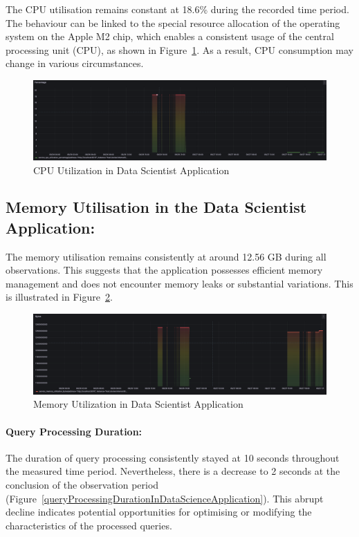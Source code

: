 \documentclass[journal]{IEEEtran}
\begin{document}
The CPU utilisation remains constant at 18.6\% during the recorded time period. The behaviour can be linked to the special resource allocation of the operating system on the Apple M2 chip, which enables a consistent usage of the central processing unit (CPU), as shown in Figure~\ref{cpuUtilizationInDataScientistApplication}. As a result, CPU consumption may change in various circumstances.

\begin{figure}[h]
  \centering
  \includegraphics[width=\textwidth]{images/CPU-utilization-data-scientist-application.png}
  \caption{CPU Utilization in Data Scientist Application}
  \label{cpuUtilizationInDataScientistApplication}
\end{figure}

\subsection{Memory Utilisation in the Data Scientist Application:}
The memory utilisation remains consistently at around 12.56 GB during all observations. This suggests that the application possesses efficient memory management and does not encounter memory leaks or substantial variations. This is illustrated in Figure~\ref{memoryUtilizationInDataScientistApplication}.


\begin{figure}[h]
  \centering
  \includegraphics[width=\textwidth]{images/memory-utilization-in-data-scientist-application.png}
  \caption{Memory Utilization in Data Scientist Application}
  \label{memoryUtilizationInDataScientistApplication}
\end{figure}

\paragraph{Query Processing Duration:}
The duration of query processing consistently stayed at 10 seconds throughout the measured time period. Nevertheless, there is a decrease to 2 seconds at the conclusion of the observation period (Figure~\ref{queryProcessingDurationInDataScienceApplication}). This abrupt decline indicates potential opportunities for optimising or modifying the characteristics of the processed queries.
\end{document}
